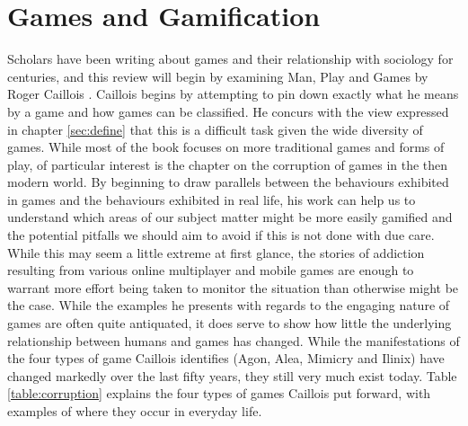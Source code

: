 \documentclass[12pt,a4paper,twoside]{report}
\begin{document}
\section{Games and Gamification}
\label{bartle}
Scholars have been writing about games and their relationship with sociology for centuries, and this review will begin by examining Man, Play and Games by Roger Caillois \cite{caillois1961man}. Caillois begins by attempting to pin down exactly what he means by a game and how games can be classified. He concurs with the view expressed in chapter \ref{sec:define} that this is a difficult task given the wide diversity of games. While most of the book focuses on more traditional games and forms of play, of particular interest is the chapter on the corruption of games in the then modern world. By beginning to draw parallels between the behaviours exhibited in games and the behaviours exhibited in real life, his work can help us to understand which areas of our subject matter might be more easily gamified and the potential pitfalls we should aim to avoid if this is not done with due care. While this may seem a little extreme at first glance, the stories of addiction resulting from various online multiplayer and mobile games are enough to warrant more effort being taken to monitor the situation than otherwise might be the case. While the examples he presents with regards to the engaging nature of games are often quite antiquated, it does serve to show how little the underlying relationship between humans and games has changed. While the manifestations of the four types of game Caillois identifies (Agon, Alea, Mimicry and Ilinix) have changed markedly over the last fifty years, they still very much exist today. Table \ref{table:corruption} explains the four types of games Caillois put forward, with examples of where they occur in everyday life.
\end{document}
